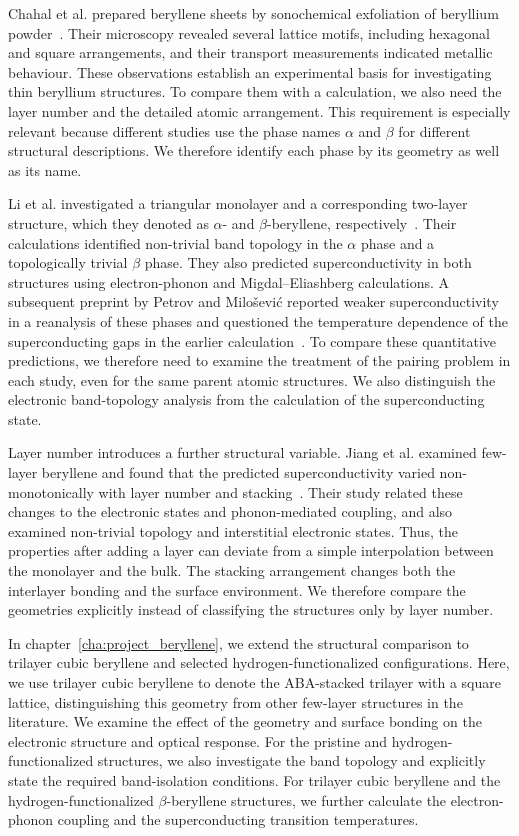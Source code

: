 Chahal et al. prepared beryllene sheets by sonochemical exfoliation of beryllium powder~\cite{chahal2023beryllene}.
Their microscopy revealed several lattice motifs, including hexagonal and square arrangements, and their transport measurements indicated metallic behaviour.
These observations establish an experimental basis for investigating thin beryllium structures.
To compare them with a calculation, we also need the layer number and the detailed atomic arrangement.
This requirement is especially relevant because different studies use the phase names $\alpha$ and $\beta$ for different structural descriptions.
We therefore identify each phase by its geometry as well as its name.

Li et al. investigated a triangular monolayer and a corresponding two-layer structure, which they denoted as $\alpha$- and $\beta$-beryllene, respectively~\cite{li2023coexistence}.
Their calculations identified non-trivial band topology in the $\alpha$ phase and a topologically trivial $\beta$ phase.
They also predicted superconductivity in both structures using electron-phonon and Migdal--Eliashberg calculations.
A subsequent preprint by Petrov and Milo\v{s}evi\'{c} reported weaker superconductivity in a reanalysis of these phases and questioned the temperature dependence of the superconducting gaps in the earlier calculation~\cite{petrov2024comment}.
To compare these quantitative predictions, we therefore need to examine the treatment of the pairing problem in each study, even for the same parent atomic structures.
We also distinguish the electronic band-topology analysis from the calculation of the superconducting state.

Layer number introduces a further structural variable.
Jiang et al. examined few-layer beryllene and found that the predicted superconductivity varied non-monotonically with layer number and stacking~\cite{jiang2025nonmonotonic}.
Their study related these changes to the electronic states and phonon-mediated coupling, and also examined non-trivial topology and interstitial electronic states.
Thus, the properties after adding a layer can deviate from a simple interpolation between the monolayer and the bulk.
The stacking arrangement changes both the interlayer bonding and the surface environment.
We therefore compare the geometries explicitly instead of classifying the structures only by layer number.

In chapter~\ref{cha:project_beryllene}, we extend the structural comparison to trilayer cubic beryllene and selected hydrogen-functionalized configurations.
Here, we use trilayer cubic beryllene to denote the ABA-stacked trilayer with a square lattice, distinguishing this geometry from other few-layer structures in the literature.
We examine the effect of the geometry and surface bonding on the electronic structure and optical response.
For the pristine and hydrogen-functionalized structures, we also investigate the band topology and explicitly state the required band-isolation conditions.
For trilayer cubic beryllene and the hydrogen-functionalized $\beta$-beryllene structures, we further calculate the electron-phonon coupling and the superconducting transition temperatures.

